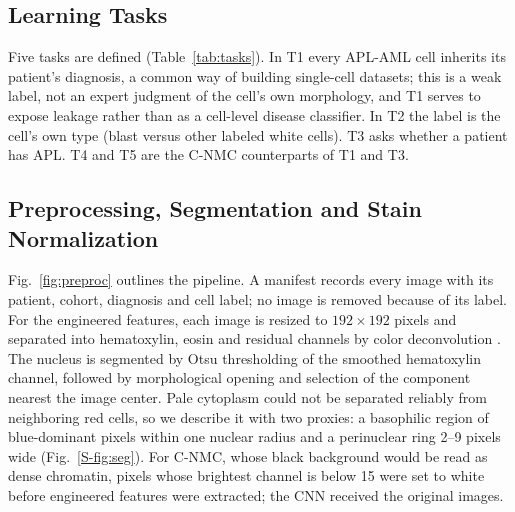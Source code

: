 \documentclass[journal]{IEEEtran}
\begin{document}
\subsection{Learning Tasks}
Five tasks are defined (Table~\ref{tab:tasks}). In T1 every APL-AML cell inherits its patient's diagnosis, a common way of building single-cell datasets; this is a weak label, not an expert judgment of the cell's own morphology, and T1 serves to expose leakage rather than as a cell-level disease classifier. In T2 the label is the cell's own type (blast versus other labeled white cells). T3 asks whether a patient has APL. T4 and T5 are the C-NMC counterparts of T1 and T3.

\begin{table}[!t]
\centering
\caption{Learning tasks (development / external set). T1--T3: APL-AML (Discovery / Validation); T4, T5: C-NMC 2019 (folds 0--1 / fold 2).}
\label{tab:tasks}
\end{table}

\subsection{Preprocessing, Segmentation and Stain Normalization}
Fig.~\ref{fig:preproc} outlines the pipeline. A manifest records every image with its patient, cohort, diagnosis and cell label; no image is removed because of its label. For the engineered features, each image is resized to $192\times192$ pixels and separated into hematoxylin, eosin and residual channels by color deconvolution \cite{ruifrok2001deconvolution}. The nucleus is segmented by Otsu thresholding \cite{otsu1979} of the smoothed hematoxylin channel, followed by morphological opening and selection of the component nearest the image center. Pale cytoplasm could not be separated reliably from neighboring red cells, so we describe it with two proxies: a basophilic region of blue-dominant pixels within one nuclear radius and a perinuclear ring 2--9 pixels wide (Fig.~\ref{S-fig:seg}). For C-NMC, whose black background would be read as dense chromatin, pixels whose brightest channel is below 15 were set to white before engineered features were extracted; the CNN received the original images.
\end{document}
